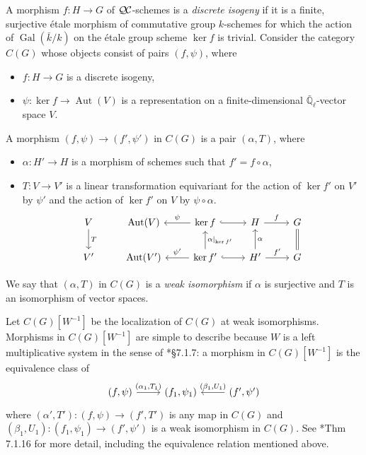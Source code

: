 \documentclass[11pt]{amsart}
\theoremstyle{plain}
\theoremstyle{definition}
\theoremstyle{remark}
\newcommand{\EE}{\mathbb{\bar Q}_\ell}
\newcommand{\bFq}{\bar{k}}
\newcommand{\Fq}{k}
\DeclareMathOperator{\Gal}{Gal}
\DeclareMathOperator{\Aut}{Aut}
\newcommand{\cdef}[1]{ {#1}\index{#1} }
\newcommand{\QC}{{\mathcal{Q\hskip-0.8pt C}}}
\begin{document}
A morphism $f : H\to G$ of $\QC$-schemes is a \emph{discrete isogeny} if it is a finite, surjective
\'etale morphism of commutative group $\Fq$-schemes for which
the action of $\Gal(\bFq/\Fq)$ on the \'etale group scheme $\ker f$ is trivial.
Consider the category $C(G)$ whose objects consist of pairs $(f,\psi)$, where
\begin{itemize}
\item $f : H\to G$ is a discrete isogeny,
\item $\psi : \ker f\to \Aut(V)$ is a representation on a finite-dimensional $\EE$-vector space $V$.
\end{itemize}
A morphism $(f,\psi) \to (f',\psi')$ in $C(G)$ is a pair $(\alpha,T)$, where
\begin{itemize}
\item $\alpha : H' \to H$ is a morphism of schemes such that $f' = f\circ \alpha$,
\item $T : V\to V'$ is a linear transformation equivariant for the action of
$\ker f'$ on $V'$ by $\psi'$ and the action of $\ker f'$ on $V$ by $\psi \circ \alpha$.
\[
\begin{tikzcd}
V \arrow{d}{T} & \Aut(V) & \arrow[swap]{l}{\psi} \ker f \arrow[hook]{r} & H \arrow{r}{f} & \arrow[equal]{d} G\\
V' & \Aut(V') & \arrow[swap]{l}{\psi'} \arrow[swap]{u}{\alpha\vert_{\ker f'}} \ker f' \arrow[hook]{r} & \arrow[swap]{u}{\alpha} H' \arrow{r}{f'} & G
\end{tikzcd}
\]
\end{itemize}
We say that $(\alpha,T)$ in $C(G)$ is a \emph{weak isomorphism} if $\alpha$ is surjective
and $T$ is an isomorphism of vector spaces.

Let \cdef{$C(G)[W^{-1}]$} be the localization of $C(G)$ at weak isomorphisms.
 Morphisms in $C(G)[W^{-1}]$ are simple to describe because 
 $W$ is a left multiplicative system in the sense of
  \cite{kashiwara-schapira:CatgoriesSheaves}*{\S 7.1.7}:
a morphism in $C(G)[W^{-1}]$ is the equivalence class of 
  \begin{equation}\label{eq:morGCf}
   \begin{tikzcd}
   (f,\psi) \arrow{r}{(\alpha_1,T_1)} & (f_1,\psi_1) & \arrow[swap]{l}{(\beta_1,U_1)} (f',\psi')
   \end{tikzcd}
  \end{equation}
 where $(\alpha',T') : (f,\psi) \to (f',T')$ is any map in $C(G)$ 
 and $(\beta_1,U_1) : (f_1,\psi_1) \to (f',\psi')$ is a weak isomorphism in $C(G)$. See \cite{kashiwara-schapira:CatgoriesSheaves}*{Thm 7.1.16} for more detail, including the equivalence relation mentioned above.
\end{document}
